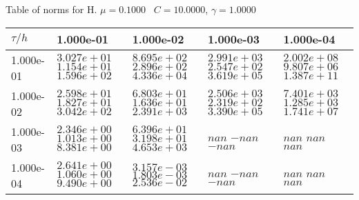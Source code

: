 \begin{center}
Table of norms for H. $\mu = 0.1000$ \, $C = 10.0000$, $\gamma = 1.0000$
  
\begin{tabular}{|p{1in}|p{1in}|p{1in}|p{1in}|p{1in}|} \hline
$\tau / h$ &1.000e-01 &1.000e-02 &1.000e-03 &1.000e-04 \\ \hline 
1.000e-01 & $3.027e+01$  $1.154e+01$  $1.596e+02$  & $8.695e+02$  $2.896e+02$  $4.336e+04$  & $2.991e+03$  $2.547e+02$  $3.619e+05$  & $2.002e+08$  $9.807e+06$  $1.387e+11$  \\ \hline 
1.000e-02 & $2.598e+01$  $1.827e+01$  $3.042e+02$  & $6.803e+01$  $1.636e+01$  $2.391e+03$  & $2.506e+03$  $2.319e+02$  $3.390e+05$  & $7.401e+03$  $1.285e+03$  $1.741e+07$  \\ \hline 
1.000e-03 & $2.346e+00$  $1.013e+00$  $8.381e+00$  & $6.396e+01$  $3.198e+01$  $4.653e+03$  & $nan$  $-nan$  $-nan$  & $nan$  $nan$  $nan$  \\ \hline 
1.000e-04 & $2.641e+00$  $1.060e+00$  $9.490e+00$  & $3.157e-03$  $1.803e-03$  $2.536e-02$  & $nan$  $-nan$  $-nan$  & $nan$  $nan$  $nan$  \\ \hline 

\end{tabular}\\[20pt]
\end{center}
